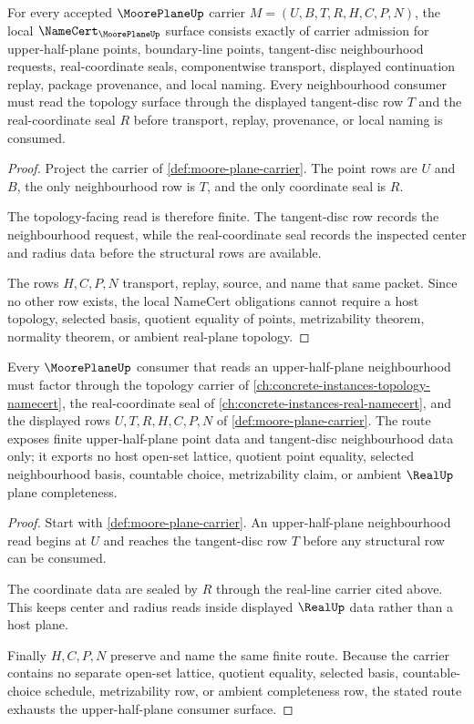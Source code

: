 \begin{theorem}
\label{thm:moore-plane-namecert-obligations}
For every accepted $\MoorePlaneUp$ carrier $M=(U,B,T,R,H,C,P,N)$, the local $\NameCert_{\MoorePlaneUp}$ surface consists exactly of carrier admission for upper-half-plane points, boundary-line points, tangent-disc neighbourhood requests, real-coordinate seals, componentwise transport, displayed continuation replay, package provenance, and local naming. Every neighbourhood consumer must read the topology surface through the displayed tangent-disc row $T$ and the real-coordinate seal $R$ before transport, replay, provenance, or local naming is consumed.
\end{theorem}
\begin{proof}
Project the carrier of \autoref{def:moore-plane-carrier}. The point rows are $U$ and $B$, the only neighbourhood row is $T$, and the only coordinate seal is $R$.

The topology-facing read is therefore finite. The tangent-disc row records the neighbourhood request, while the real-coordinate seal records the inspected center and radius data before the structural rows are available.

The rows $H,C,P,N$ transport, replay, source, and name that same packet. Since no other row exists, the local NameCert obligations cannot require a host topology, selected basis, quotient equality of points, metrizability theorem, normality theorem, or ambient real-plane topology.
\end{proof}

\begin{theorem}
\label{thm:moore-plane-upper-half-plane-route}
Every $\MoorePlaneUp$ consumer that reads an upper-half-plane neighbourhood must factor through the topology carrier of \autoref{ch:concrete-instances-topology-namecert}, the real-coordinate seal of \autoref{ch:concrete-instances-real-namecert}, and the displayed rows $U,T,R,H,C,P,N$ of \autoref{def:moore-plane-carrier}. The route exposes finite upper-half-plane point data and tangent-disc neighbourhood data only; it exports no host open-set lattice, quotient point equality, selected neighbourhood basis, countable choice, metrizability claim, or ambient $\RealUp$ plane completeness.
\end{theorem}
\begin{proof}
Start with \autoref{def:moore-plane-carrier}. An upper-half-plane neighbourhood read begins at $U$ and reaches the tangent-disc row $T$ before any structural row can be consumed.

The coordinate data are sealed by $R$ through the real-line carrier cited above. This keeps center and radius reads inside displayed $\RealUp$ data rather than a host plane.

Finally $H,C,P,N$ preserve and name the same finite route. Because the carrier contains no separate open-set lattice, quotient equality, selected basis, countable-choice schedule, metrizability row, or ambient completeness row, the stated route exhausts the upper-half-plane consumer surface.
\end{proof}

